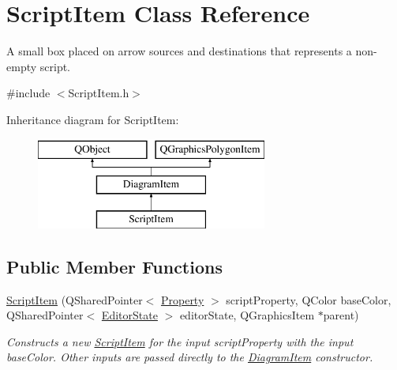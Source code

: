 \hypertarget{class_script_item}{\section{Script\-Item Class Reference}
\label{class_script_item}
}


A small box placed on arrow sources and destinations that represents a non-\/empty script.  




{\ttfamily \#include $<$Script\-Item.\-h$>$}

Inheritance diagram for Script\-Item\-:\begin{figure}[H]
\begin{center}
\leavevmode
\includegraphics[height=3.000000cm]{class_script_item}
\end{center}
\end{figure}
\subsection*{Public Member Functions}
\begin{DoxyCompactItemize}
\item 
\hypertarget{class_script_item_afe6a3a691b4c0e18315dadbc1603e069}{\hyperlink{class_script_item_afe6a3a691b4c0e18315dadbc1603e069}{Script\-Item} (Q\-Shared\-Pointer$<$ \hyperlink{class_picto_1_1_property}{Property} $>$ script\-Property, Q\-Color base\-Color, Q\-Shared\-Pointer$<$ \hyperlink{class_editor_state}{Editor\-State} $>$ editor\-State, Q\-Graphics\-Item $\ast$parent)}\label{class_script_item_afe6a3a691b4c0e18315dadbc1603e069}

\begin{DoxyCompactList}\small\item\em Constructs a new \hyperlink{class_script_item}{Script\-Item} for the input script\-Property with the input base\-Color. Other inputs are passed directly to the \hyperlink{class_diagram_item}{Diagram\-Item} constructor. \end{DoxyCompactList}\end{DoxyCompactItemize}
